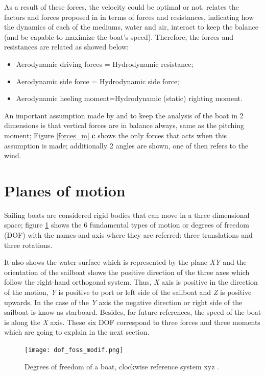 As a result of these forces, the velocity could be optimal or not. \cite{larsonprinciples} relates the factors and forces proposed in\cite{philpott1993yacht} in terms of forces and resistances, indicating how the dynamics of each of the mediums, water and air, interact to keep the balance (and be capable to maximize the boat's speed). Therefore, the forces and resistances are related as showed below: \par 
\begin{itemize}  \label{milgramforces}
 \setlength \itemsep{0em}
\item Aerodynamic driving forces = Hydrodynamic resistance;
\item Aerodynamic side force = Hydrodynamic side force;
\item Aerodynamic heeling moment=Hydrodynamic (static) righting moment.
\end{itemize}
An important assumption made by  \cite{philpott1993yacht} and \cite{larsonprinciples} to keep the analysis of the boat in 2 dimensions is that vertical forces are in balance always, same as the pitching moment; Figure \ref{forces_m} \textbf{c} shows the only forces that acts when this assumption is made; additionally 2 angles are shown, one of then refers to the wind.\par

\section{Planes of motion}
Sailing boats are considered rigid bodies that can move in a three dimensional space; figure \ref{DOF} shows the 6 fundamental types of motion or degrees of freedom (DOF)  with the names and axis where they are referred: three translations and three rotations. \par 
It also shows the water surface which is represented by the plane \textit{XY} and the orientation of the sailboat shows the positive direction of the three axes which follow the right-hand orthogonal system. Thus, \textit{X} axis is positive in the direction of the motion, \textit{Y} is positive to port or left side of the sailboat and \textit{Z} is positive upwards. In the case of the \textit{Y} axis the negative direction or right side of the sailboat is know as starboard.  Besides, for future references, the speed of the boat is along the \textit{X} axis. These six DOF correspond to three forces and three moments which are going to explain in the next section. \par 
\begin{figure} %
\centering
  \texttt{[image: dof\_foss\_modif.png]}
 \caption{Degrees of freedom of a boat, clockwise reference system xyz \cite{fossati2009aero}. }
\label{DOF}
\end{figure}

